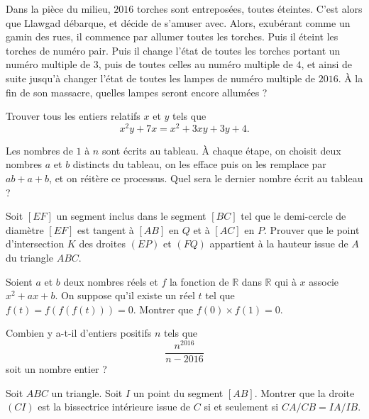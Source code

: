 \begin{exo}{} Dans la pièce du milieu, $2016$ torches sont entreposées, toutes éteintes. C'est alors que Llawgad débarque, et décide de s'amuser avec. Alors, exubérant comme un gamin des rues, il commence par allumer toutes les torches. Puis il éteint les torches de numéro pair. Puis il change l'état de toutes les torches portant un numéro multiple de $3$, puis de toutes celles au numéro multiple de $4$, et ainsi de suite jusqu'à changer l'état de toutes les lampes de numéro multiple de $2016$. \`A la fin de son massacre, quelles lampes seront encore allumées ?
\end{exo}

\begin{exo}{}
Trouver tous les entiers relatifs $x$ et $y$ tels que \[x^2y+7x=x^2+3xy+3y+4.\]
\end{exo}

\begin{exo}{} 
Les nombres de $1$ à $n$ sont écrits au tableau. \`A chaque étape, on choisit deux nombres $a$ et $b$ distincts du tableau, on les efface puis on les remplace par $ab+a+b$, et on réitère ce processus. Quel sera le dernier nombre écrit au tableau ?
\end{exo}

\begin{exo}{}Soit $[EF]$ un segment inclus dans le segment $[BC]$ tel que le demi-cercle de diamètre $[EF]$ est tangent à $[AB]$ en $Q$ et à $[AC]$ en $P$. Prouver que le point d'intersection $K$ des droites $(EP)$ et $(FQ)$ appartient à la hauteur issue de $A$ du triangle $ABC$.
\end{exo}

\begin{exo}{}
Soient $a$ et $b$ deux nombres réels et $f$ la fonction de $\mathbb{R}$ dans $\mathbb{R}$ qui à $x$ associe $x^2+ax+b$. On suppose  qu'il existe un réel $t$ tel que $f(t)=f(f(f(t)))=0$. Montrer que $f(0) \times f(1)=0$.
\end{exo}

\begin{exo}{}
Combien y a-t-il d'entiers positifs $n$ tels que
\[\frac{n^{2016}}{n-2016}\]
soit un nombre entier ?
\end{exo}

\begin{exo}{}Soit $ABC$ un triangle. Soit $I$ un point du segment $[AB]$. Montrer que la droite $(CI)$ est la bissectrice intérieure issue de $C$ si et seulement si $CA/CB=IA/IB$.
\end{exo}

